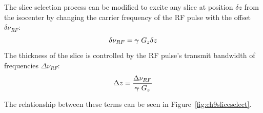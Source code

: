 \hfill

The slice selection process can be modified to excite any slice at position $\delta z$ from the isocenter by changing the carrier frequency of the RF pulse with the offset $\delta \nu_{RF}$:
\begin{equation} \label{eq:913}
    \delta \nu_{RF} = \text{\sout{$\gamma$} } G_z \delta z
\end{equation}
The thickness of the slice is controlled by the RF pulse's transmit bandwidth of frequencies $\Delta \nu_{RF}$:
\begin{equation} \label{eq:914}
    \Delta z = \frac{\Delta \nu_{RF}}{\text{\sout{$\gamma$} } G_z} 
\end{equation}

The relationship between these terms can be seen in Figure~\ref{fig:ch9sliceselect}.

